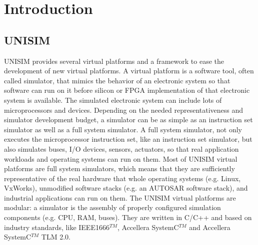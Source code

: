 \section{Introduction}

\subsection{UNISIM}

UNISIM provides several virtual platforms and a framework to ease the development of new virtual platforms.
A virtual platform is a software tool, often called simulator, that mimics the behavior of an electronic system so that software can run on it before silicon or FPGA implementation of that electronic system is available.
The simulated electronic system can include lots of microprocessors and devices.
Depending on the needed representativeness and simulator development budget, a simulator can be as simple as an instruction set simulator as well as a full system simulator.
A full system simulator, not only executes the microprocessor instruction set, like an instruction set simulator, but also simulates buses, I/O devices, sensors, actuators, so that real application workloads and operating systems can run on them.
Most of UNISIM virtual platforms are full system simulators, which means that they are sufficiently representative of the real hardware that whole operating systems (e.g. Linux, VxWorks), unmodified software stacks (e.g. an AUTOSAR software stack), and industrial applications can run on them.
The UNISIM virtual platforms are modular: a simulator is the assembly of properly configured simulation components (e.g. CPU, RAM, buses).
They are written in C/C++ and based on industry standards, like IEEE1666$^{TM}$, Accellera SystemC$^{TM}$ and Accellera SystemC$^{TM}$ TLM 2.0.

